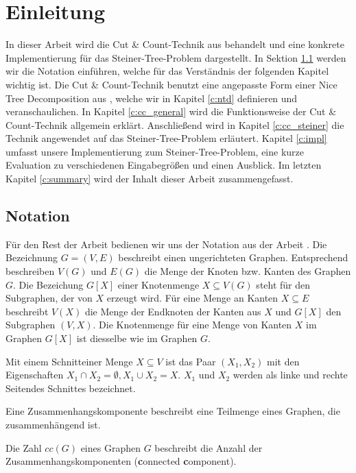 \chapter{Einleitung}
\label{c:intro} %
In dieser Arbeit wird die Cut \& Count-Technik aus \cite{cygan_solving_2011} behandelt und eine konkrete Implementierung für das Steiner-Tree-Problem dargestellt. 
In Sektion \ref{sec:intro_not} werden wir die Notation einführen, welche für das Verständnis der folgenden Kapitel wichtig ist. Die Cut \& Count-Technik benutzt eine angepasste Form einer Nice Tree Decomposition aus \cite{kloks1994}, welche wir in Kapitel \ref{c:ntd} definieren und veranschaulichen.
In Kapitel \ref{c:cc_general} wird die Funktionsweise der Cut \& Count-Technik allgemein erklärt. 
Anschließend wird in Kapitel \ref{c:cc_steiner} die Technik angewendet auf das Steiner-Tree-Problem erläutert. 
Kapitel \ref{c:impl} umfasst unsere Implementierung zum Steiner-Tree-Problem, eine kurze Evaluation zu verschiedenen Eingabegrößen und einen Ausblick. 
Im letzten Kapitel \ref{c:summary} wird der Inhalt dieser Arbeit zusammengefasst.

\section{Notation}
\label{sec:intro_not}
Für den Rest der Arbeit bedienen wir uns der Notation aus der Arbeit \cite{cygan_solving_2011}. Die Bezeichnung $G=(V,E)$ beschreibt einen ungerichteten Graphen. Entsprechend beschreiben $V(G)$ und $E(G)$ die Menge der Knoten bzw. Kanten des Graphen $G$. Die Bezeichung $G[X]$ einer Knotenmenge $X \subseteq V(G)$ steht für den Subgraphen, der von $X$ erzeugt wird. Für eine Menge an Kanten $X \subseteq E$ beschreibt $V(X)$ die Menge der Endknoten der Kanten aus $X$ und $G[X]$ den Subgraphen $(V,X)$. Die Knotenmenge für eine Menge von Kanten $X$ im Graphen $G[X]$ ist diesselbe wie im Graphen $G$.

Mit einem \glqq Schnitt\grqq einer Menge $X \subseteq V$ ist das Paar $(X_1,X_2)$ mit den Eigenschaften $X_1 \cap X_2 = \emptyset,X_1 \cup X_2 = X$. $X_1$ und $X_2$ werden als linke und rechte \glqq Seiten\grqq des Schnittes bezeichnet. 

Eine Zusammenhangskomponente beschreibt eine Teilmenge eines Graphen, die zusammenhängend ist.

Die Zahl $cc(G)$ eines Graphen $G$ beschreibt die Anzahl der Zusammenhangskomponenten (\glqq \textbf{c}onnected \textbf{c}omponent\grqq).

